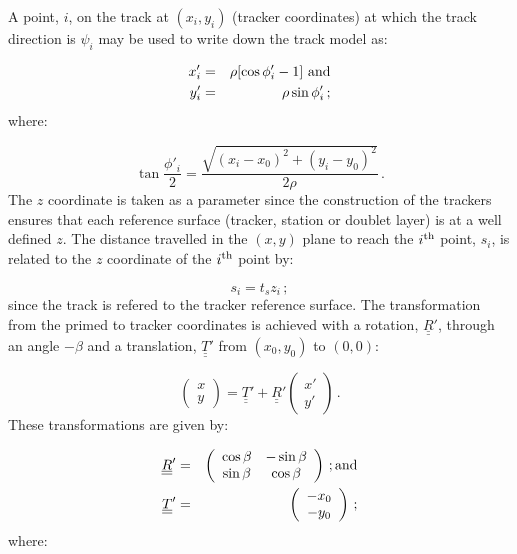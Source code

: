 A point, $i$, on the track at $(x_i, y_i)$ (tracker coordinates) at which the track direction is $\psi_i$ may be used to write down the track model as:

\begin{eqnarray}
  x'_i & = & \rho [ \cos\phi'_i - 1 ] {\rm~and} \\
  y'_i & = & \rho \sin\phi'_i \,;
\end{eqnarray}
where:

\begin{equation}
  \tan \frac{\phi'_i}{2} = 
                       \frac{\sqrt{(x_i - x_0)^2 + (y_i - y_0)^2}}
                       {2\rho} \, .
\end{equation}
The $z$ coordinate is taken as a parameter since the construction of the trackers ensures that each reference surface (tracker, station or doublet layer) is at a well defined $z$. The distance travelled in the $(x, y)$ plane to reach the $i^{\rm th}$ point, $s_i$, is related to the $z$ coordinate of the $i^{\rm th}$ point by:

\begin{equation}
  s_i = t_s z_i \, ;
  \label{Eq:sFnz}
\end{equation}
since the track is refered to the tracker reference surface. The transformation from the primed to tracker coordinates is achieved with a rotation, $\underline{\underline{R}}'$, through an angle $-\beta$ and a translation, $\underline{\underline{T}}'$ from $(x_0, y_0)$ to $(0, 0)$:

\begin{equation}
  \left(
      \begin{array}{cc}
         x                                                         \\
         y
      \end{array}
  \right)                 =
  \underline{\underline{T}}' + \underline{\underline{R}}'
  \left(
      \begin{array}{cc}
         x'                                                        \\
         y'
      \end{array}
  \right) \, .
\end{equation}
These transformations are given by:

\begin{eqnarray}
  \underline{\underline{R}}' & = & 
    \left( 
      \begin{array}{cc}
         \cos \beta & -\sin \beta \\
         \sin \beta & \cos \beta 
      \end{array}
    \right) \, ; {\rm and}                                         \\
  \underline{\underline{T}}' & = &
    \left( 
      \begin{array}{c}
         -x_0  \\
         -y_0 
      \end{array}
    \right) \, ;                                                  \\
\end{eqnarray}
where:

